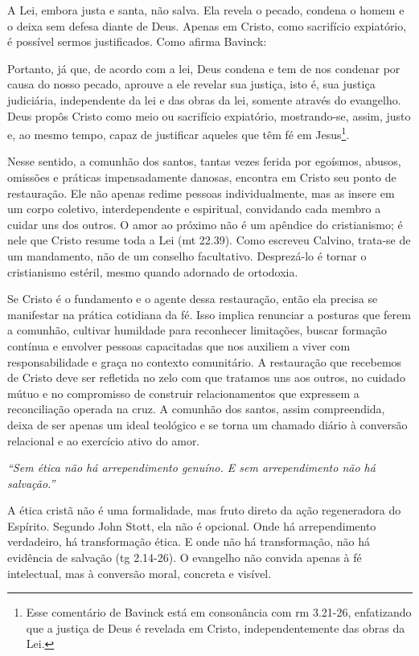 A Lei, embora justa e santa, não salva. Ela revela o pecado, condena o homem e o deixa sem defesa diante de Deus. Apenas em Cristo, como sacrifício expiatório, é possível sermos justificados. Como afirma Bavinck:

\begin{citacao}
    Portanto, já que, de acordo com a lei, Deus condena e tem de nos condenar por causa do nosso pecado, aprouve a ele revelar sua justiça, isto é, sua justiça judiciária, independente da lei e das obras da lei, somente através do evangelho. Deus propôs Cristo como meio ou sacrifício expiatório, mostrando-se, assim, justo e, ao mesmo tempo, capaz de justificar aqueles que têm fé em Jesus\footnote{Esse comentário de Bavinck está em consonância com \gls{rm} 3.21-26, enfatizando que a justiça de Deus é revelada em Cristo, independentemente das obras da Lei.}. \cite[p.~212]{bavinck2012}
\end{citacao}

Nesse sentido, a comunhão dos santos, tantas vezes ferida por egoísmos, abusos, omissões e práticas impensadamente danosas, encontra em Cristo seu ponto de restauração. Ele não apenas redime pessoas individualmente, mas as insere em um corpo coletivo, interdependente e espiritual, convidando cada membro a cuidar uns dos outros. O amor ao próximo não é um apêndice do cristianismo; é nele que Cristo resume toda a Lei (\gls{mt} 22.39). Como escreveu Calvino, trata-se de um mandamento, não de um conselho facultativo. Desprezá-lo é tornar o cristianismo estéril, mesmo quando adornado de ortodoxia.

Se Cristo é o fundamento e o agente dessa restauração, então ela precisa se manifestar na prática cotidiana da fé. Isso implica renunciar a posturas que ferem a comunhão, cultivar humildade para reconhecer limitações, buscar formação contínua e envolver pessoas capacitadas que nos auxiliem a viver com responsabilidade e graça no contexto comunitário. A restauração que recebemos de Cristo deve ser refletida no zelo com que tratamos uns aos outros, no cuidado mútuo e no compromisso de construir relacionamentos que expressem a reconciliação operada na cruz. A comunhão dos santos, assim compreendida, deixa de ser apenas um ideal teológico e se torna um chamado diário à conversão relacional e ao exercício ativo do amor.

\textit{``Sem ética não há arrependimento genuíno. E sem arrependimento não há salvação.''} \cite[p.~102]{stott2008}

A ética cristã não é uma formalidade, mas fruto direto da ação regeneradora do Espírito. Segundo John Stott, ela não é opcional. Onde há arrependimento verdadeiro, há transformação ética. E onde não há transformação, não há evidência de salvação (\gls{tg} 2.14-26). O evangelho não convida apenas à fé intelectual, mas à conversão moral, concreta e visível.

